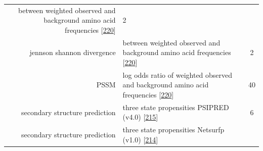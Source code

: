 \documentclass[11pt,a4paper,twoside]{book}
\theoremstyle{definition}
\theoremstyle{definition}
\theoremstyle{remark}
\begin{document}
\begin{longtable}[]{@{}rlc@{}}
\begin{minipage}[t]{0.50\columnwidth}
between weighted observed and background amino acid frequencies
{[}\protect\hyperlink{ref-Robinson1991}{220}{]}\strut
\end{minipage} & \begin{minipage}[t]{0.18\columnwidth}\centering\strut
2\strut
\end{minipage}\tabularnewline
\begin{minipage}[t]{0.23\columnwidth}\raggedleft\strut
jennson shannon divergence\strut
\end{minipage} & \begin{minipage}[t]{0.50\columnwidth}\raggedright\strut
between weighted observed and background amino acid frequencies
{[}\protect\hyperlink{ref-Robinson1991}{220}{]}\strut
\end{minipage} & \begin{minipage}[t]{0.18\columnwidth}\centering\strut
2\strut
\end{minipage}\tabularnewline
\begin{minipage}[t]{0.23\columnwidth}\raggedleft\strut
PSSM\strut
\end{minipage} & \begin{minipage}[t]{0.50\columnwidth}\raggedright\strut
log odds ratio of weighted observed and background amino acid
frequencies {[}\protect\hyperlink{ref-Robinson1991}{220}{]}\strut
\end{minipage} & \begin{minipage}[t]{0.18\columnwidth}\centering\strut
40\strut
\end{minipage}\tabularnewline
\begin{minipage}[t]{0.23\columnwidth}\raggedleft\strut
secondary structure prediction\strut
\end{minipage} & \begin{minipage}[t]{0.50\columnwidth}\raggedright\strut
three state propensities PSIPRED (v4.0)
{[}\protect\hyperlink{ref-Jones1999}{215}{]}\strut
\end{minipage} & \begin{minipage}[t]{0.18\columnwidth}\centering\strut
6\strut
\end{minipage}\tabularnewline
\begin{minipage}[t]{0.23\columnwidth}\raggedleft\strut
secondary structure prediction\strut
\end{minipage} & \begin{minipage}[t]{0.50\columnwidth}\raggedright\strut
three state propensities Netsurfp (v1.0)
{[}\protect\hyperlink{ref-Petersen2009a}{214}{]}\strut
\end{minipage} & \begin{minipage}[t]{0.18\columnwidth}\centering\strut

\end{minipage}
\end{longtable}
\end{document}
